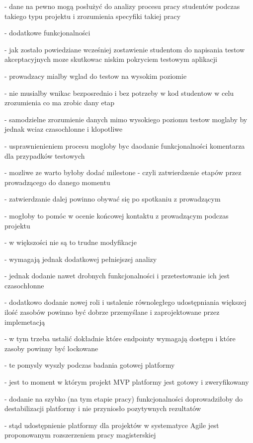     - dane na pewno mogą posłużyć do analizy procesu pracy studentów podczas takiego typu projektu i zrozumienia specyfiki takiej pracy

    - dodatkowe funkcjonalności

    - jak zostało powiedziane wcześniej zostawienie studentom do napisania testow akceptacyjnych moze skutkowac niskim pokryciem testowym aplikacji

    - prowadzacy mialby wglad do testow na wysokim poziomie

    - nie musialby wnikac bezposrednio i bez potrzeby  w kod studentow w celu zrozumienia co ma zrobic dany etap

    - samodzielne zrozumienie danych mimo wysokiego poziomu testow moglaby by jednak wciaz czasochlonne i klopotliwe

    - usprawnienieniem procesu mogloby byc daodanie funkcjonalności komentarza dla przypadków testowych

    - mozliwe ze warto byłoby dodać milestone - czyli zatwierdzenie etapów przez prowadzącego do danego momentu

    - zatwierdzanie dalej powinno obywać się po spotkaniu z prowadzącym

    - mogłoby to pomóc w ocenie końcowej kontaktu z prowadzącym podczas projektu

- w większości nie są to trudne modyfikacje

- wymagają jednak dodatkowej pełniejszej analizy

- jednak dodanie nawet drobnych funkcjonalności i przetestowanie ich jest czasochłonne

- dodatkowo dodanie nowej roli i ustalenie równoległego udostępniania większej ilość zasobów powinno być dobrze przemyślane i zaprojektowane przez implemetacją

- w tym trzeba ustalić dokładnie które endpointy wymagają dostępu i które zasoby powinny być lockowane

- te pomysly wyszly podczas badania gotowej platformy

- jest to moment w którym projekt MVP platformy jest gotowy i zweryfikowany

- dodanie na szybko (na tym etapie pracy) funkcjonalności doprowadziłoby do destabilizacji platformy i nie przyniosło pozytywnych rezultatów

- stąd udostępnienie platformy dla projektów w systematyce Agile jest proponowanym rozszerzeniem pracy magisterskiej



